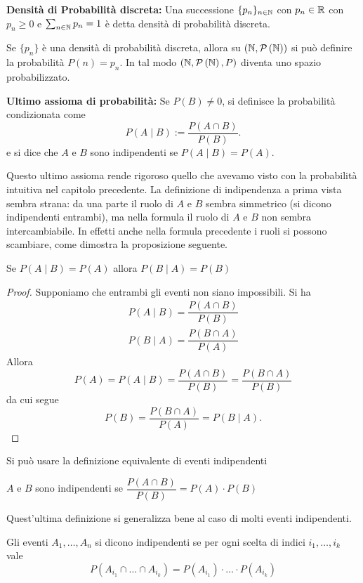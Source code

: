 \begin{defn}
	\textbf{Densit\`a di Probabilit\`a discreta:}
	Una successione $ \{p_n\}_{n \in \mathbb{N}} $ con $ p_n \in \mathbb{R} $ con $ p_n \geq 0 $ e $ \sum_{n \in \mathbb{N}} p_n = 1 $
	\`e detta densit\`a di probabilit\`a discreta.

	Se $ \{p_n\} $ \`e una densit\`a di probabilit\`a discreta, allora su $ ( \mathbb{N}, \mathcal{P}\left(\mathbb{N}\right)) $ si pu\`o definire la probabilit\`a $P(n)=p_n$. In tal modo $ ( \mathbb{N}, \mathcal{P}\left(\mathbb{N}\right),P) $ diventa uno spazio probabilizzato.
\end{defn}

\begin{defn}
	\textbf{Ultimo assioma di probabilit\`a:}
	Se $P(B)\neq0$, si definisce la probabilit\`a condizionata come $$ P(A \mid B) := \dfrac{P(A \cap B)}{P(B)} .$$
	e si dice che $A$ e $B$ sono indipendenti se  $ P(A \mid B) = P(A) $.
\end{defn}

Questo ultimo assioma rende rigoroso quello che avevamo visto con la probabilit\`a intuitiva nel capitolo precedente. La definizione di indipendenza a prima vista sembra strana: da una parte il ruolo di $A$ e $B$
sembra simmetrico (si dicono indipendenti entrambi), ma nella formula il ruolo di $A$ e $B$ non sembra
intercambiabile. In effetti anche nella formula precedente i ruoli si possono scambiare, come dimostra la 
proposizione seguente.
\begin{prop}
	Se $ P(A \mid B) = P(A)$ allora $P(B \mid A) = P(B) $
\end{prop}
\begin{proof} Supponiamo che entrambi gli eventi non siano impossibili. Si ha
	\begin{equation*}
	\begin{aligned}
		P(A \mid B) = \dfrac{P(A \cap B)}{P(B)} \\
		P(B \mid A) = \dfrac{P(B \cap A)}{P(A)}
	\end{aligned}
	\end{equation*}
Allora
$$
P(A)=P(A \mid B) = \dfrac{P(A \cap B)}{P(B)}= \dfrac{P(B \cap A)}{P(B)}
$$
da cui segue 
$$
P(B)= \dfrac{P(B \cap A)}{P(A)}=P(B \mid A).
$$
\end{proof}	
Si pu\`o usare la definizione equivalente di eventi indipendenti
\begin{defn}
$A$ e $B$ sono indipendenti se $\dfrac{P(A \cap B)}{P(B)}=P(A)\cdot P(B)$
\end{defn}
Quest'ultima definizione si generalizza bene al caso di molti eventi indipendenti.
\begin{defn}
Gli eventi $ A_1, \dots, A_n $ si dicono indipendenti se per ogni scelta di indici $i_1, \dots, i_k $ vale
	\begin{equation*}
	 P \left(A_{i_1}\cap\dots\cap A_{i_k}\right) = P(A_{i_1}) \cdot \dots \cdot P(A_{i_k})
	\end{equation*}
\end{defn}

